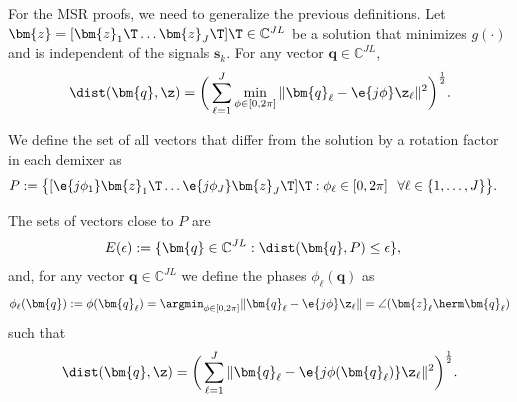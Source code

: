 For the MSR proofs, we need to generalize the previous definitions. Let $\bm{z}=[\bm{z}_1\T \ldots \bm{z}_J\T]\T\in\mathbb{C}^{J L}$ be a solution that minimizes $g(\cdot)$ and is independent of the signals $\bm{s}_k$. For any vector $\bm{q}\in\mathbb{C}^{J L}$,
\begin{equation}
\dist(\bm{q},\z)=\bigg(\sum_{\ell=1}^J \min_{\phi\in[0,2\pi]}\|\bm{q}_{\ell}-\e{j\phi}\z_{\ell}\|^2\bigg)^{\frac{1}{2}}.
\end{equation}

We define the set of all vectors that differ from the solution 
by a rotation factor in each demixer as
\begin{align}
P&:=\big\{[\e{j\phi_1}\bm{z}_1\T\ldots\e{j\phi_J}\bm{z}_J\T]\T:\phi_{\ell}\in[0,2\pi]\,\;\;\forall \ell\in\{1,\ldots,J\}\big\}.
\end{align}

The sets of vectors close to $P$ are
\begin{align}
E(\epsilon)&:=\{\bm{q}\in\mathbb{C}^{J L}:\dist(\bm{q},P)\leq\epsilon\},
\end{align}
and, for any vector $\bm{q}\in\mathbb{C}^{J L}$ we define the phases $\phi_{\ell}(\bm{q})$ as
\begin{equation}
\phi_{\ell}(\bm{q}):=\phi(\bm{q}_{\ell})=\argmin_{\phi\in[0,2\pi]}\|\bm{q}_{\ell}-\e{j\phi}\z_{\ell}\|=\angle(\bm{z}_{\ell}\herm\bm{q}_{\ell})
\end{equation}
such that
\begin{equation}
\dist(\bm{q},\z)=\bigg(\sum_{\ell=1}^J \|\bm{q}_{\ell}-\e{j\phi(\bm{q}_{\ell})}\z_{\ell}\|^2\bigg)^{\frac{1}{2}}.
\end{equation}

